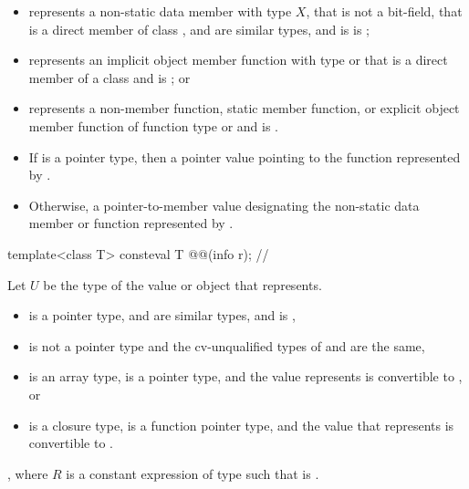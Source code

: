 \begin{itemdescr}
\pnum
\constantwhen
\begin{itemize}
\item
   represents a non-static data member with type $X$,
  that is not a bit-field,
  that is a direct member of class ,
   and  are similar types, and
   is  is ;
\item
   represents an implicit object member function
  with type  or 
  that is a direct member of a class 
  and  is ; or
\item
   represents a non-member function,
  static member function, or
  explicit object member function
  of function type  or 
  and  is .
\end{itemize}

\pnum
\returns
\begin{itemize}
\item
  If  is a pointer type,
  then a pointer value pointing to the function represented by .
\item
  Otherwise, a pointer-to-member value
  designating the non-static data member or function represented by .
\end{itemize}
\end{itemdescr}

\begin{itemdecl}
template<class T>
  consteval T @@(info r);    // \expos
\end{itemdecl}

\begin{itemdescr}
\pnum
Let $U$ be the type of the value or object that  represents.

\pnum
\constantwhen
\begin{itemize}
\item
   is a pointer type,
   and  are similar types, and
   is ,
\item
   is not a pointer type
  and the cv-unqualified types of  and  are the same,
\item
   is an array type,
   is a pointer type, and
  the value  represents is convertible to , or
\item
   is a closure type,
   is a function pointer type, and
  the value that  represents is convertible to .
\end{itemize}

\pnum
\returns
{},
where $R$ is a constant expression of type 
such that  is .
\end{itemdescr}

